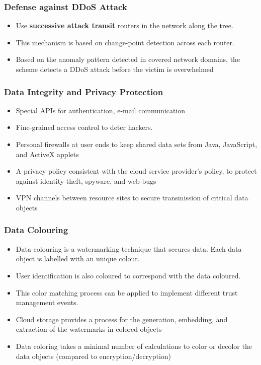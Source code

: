 \documentclass{article}
\begin{document}
\subsubsection{Defense against DDoS Attack}
\begin{itemize}
    \item Use \textbf{successive attack transit} routers in the network along the tree. 
    
    \item This mechanism is based on change-point detection across each router. 
    
    \item Based on the anomaly pattern detected in covered network domains, the scheme detects a DDoS attack before the victim is overwhelmed 
\end{itemize}

\subsubsection{Data Integrity and Privacy Protection}
\begin{itemize}
    \item Special APIs for authentication, e-mail communication 
    
    \item Fine-grained access control to deter hackers. 
    
    \item Personal firewalls at user ends to keep shared data sets from Java, JavaScript, and ActiveX applets
    
    \item A privacy policy consistent with the cloud service provider’s policy, to protect against identity theft, spyware, and web bugs
    
    \item VPN channels between resource sites to secure transmission of critical data objects
\end{itemize}
\subsubsection{Data Colouring}
\begin{itemize}
    \item Data colouring is a watermarking technique that secures data. Each data object is labelled with an unique colour. 
    
    \item User identification is also coloured to correspond with the data coloured. 
    
    \item This color matching process can be applied to implement different trust management events. 
    
    \item Cloud storage provides a process for the generation, embedding, and extraction of the watermarks in colored objects
    
    \item Data coloring takes a minimal number of calculations to color or decolor the data objects (compared to encryption/decryption)
\end{itemize}
\end{document}
